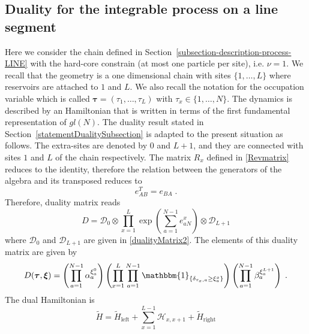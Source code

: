 \documentclass[10pt]{article}
\numberwithin{equation}{section}
\numberwithin{equation}{subsection}
\newcommand{\dt}{\;.}
\begin{document}
\subsection{Duality for the integrable process on a line segment}\label{integrableChain-duality}
Here we consider the chain defined in Section~\ref{subsection-description-process-LINE} with the hard-core constrain {(at most one particle per site)}, i.e. $\nu=1$. 
We recall that the geometry is a one dimensional chain with sites $\{1,\ldots,L\}$ where reservoirs are attached to $1$ and $L$. 
We also recall the notation for the occupation variable which is called $\bm{\tau}=(\tau_1,\ldots,\tau_L)$ with $\tau_x\in\{1,\ldots,N\}$.
The dynamics is described by an Hamiltonian that is written in terms of the first fundamental representation of ${gl}(N)$. The duality result stated in Section~\ref{statementDualitySubsection} is adapted to the present situation as follows. 
The extra-sites are denoted by $0$ and $L+1$, and they are connected with sites $1$ and $L$ of the chain respectively. The matrix $R_{x}$ defined in \eqref{Revmatrix} 
reduces to the identity, therefore the relation between the generators of the algebra and its transposed reduces to
\begin{equation}\label{transpostionPropertyFund}
	e_{AB}^T= e_{BA}\dt
\end{equation}
Therefore, duality matrix reads
\begin{equation}
	D=\mathcal{D}_{0}\otimes\prod_{x=1}^{L}\exp{\left(\sum_{a=1}^{N-1}e_{aN}^{x}\right)}\otimes \mathcal{D}_{L+1}
\end{equation}
where $\mathcal{D}_{0}$ and $\mathcal{D}_{L+1}$ are given in \eqref{dualityMatrix2}. 
The elements of this duality matrix are given by
\begin{equation}\label{ElementsDualityMatrixChain_1}
	D(\bm{\tau},\bm{\xi})=\left(\prod_{a=1}^{N-1}\alpha_{a}^{\xi_{a}^{0}}\right)\left(\prod_{x=1}^{L}\prod_{a=1}^{N-1}\mathbbm{1}_{\{\delta_{\tau_{x},a}\geq \xi_{a}^{x}\}}\right)\left(\prod_{a=1}^{N-1}\beta_{a}^{\xi_{a}^{L+1}}\right)\dt
\end{equation}
The dual Hamiltonian is
\begin{equation}
	\widetilde{H}=\widetilde{H}_{\text{left}}+\sum_{x=1}^{L-1}\mathcal{H}_{x,x+1}+\widetilde{H}_{\text{right}}
\end{equation}
\end{document}
